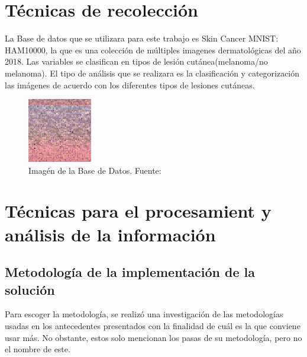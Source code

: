 



\section{Técnicas de recolección}

La Base de datos que se utilizara para este trabajo es Skin Cancer MNIST: HAM10000, la que es una colección de múltiples imagenes dermatológicas del año 2018. Las variables se clasifican en tipos de lesión cutánea(melanoma/no melanoma). El tipo de análisis que se realizara es la clasificación y categorización las imágenes de acuerdo con los diferentes tipos de lesiones cutáneas.

\begin{figure}[h]
	\begin{center}
		\includegraphics[width=0.25\textwidth]{3/figures/dataset-card.png}
		\caption{Imagén de la Base de Datos. Fuente: \cite{kaggleSkinCancer}}
		\label{1:fig 17}
	\end{center}
\end{figure}





\section{Técnicas para el procesamient y análisis de la información}

\subsection{Metodología de la implementación de la solución}

Para escoger la metodología, se realizó una investigación de las metodologías usadas en los antecedentes presentados con la finalidad de cuál es la que conviene usar más. No obstante, estos solo mencionan los pasas de su metodología, pero no el nombre de este. 

